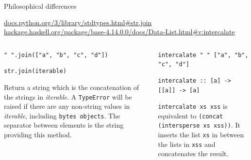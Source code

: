 \documentclass[8pt]{beamer}
\begin{document}
\begin{frame}[fragile]{Philosophical differences}

{\tiny \url{docs.python.org/3/library/stdtypes.html#str.join}}
{\tiny \url{hackage.haskell.org/package/base-4.14.0.0/docs/Data-List.html#v:intercalate}}

\begin{columns}%
\begin{column}{.48\textwidth}
\begin{verbatim}
" ".join(["a", "b", "c", "d"])
\end{verbatim}
\begin{verbatim}
str.join(iterable)
\end{verbatim}

Return a string which is the concatenation of the strings in \emph{iterable}. A
\verb|TypeError| will be raised if there are any non-string values in \emph{iterable},
including \verb|bytes objects|. The separator between elements is the string providing
this method.


\end{column}
%
\begin{column}{.48\textwidth}
\begin{verbatim}
intercalate " " ["a", "b", "c", "d"]
\end{verbatim}

\begin{verbatim}
intercalate :: [a] -> [[a]] -> [a]
\end{verbatim}

\verb|intercalate xs xss| is equivalent to \verb|(concat (intersperse xs xss))|.
It inserts the list \verb|xs| in between the lists in \verb|xss| and concatenates the result.

\end{column}
\end{columns}

\end{frame}
\end{document}
